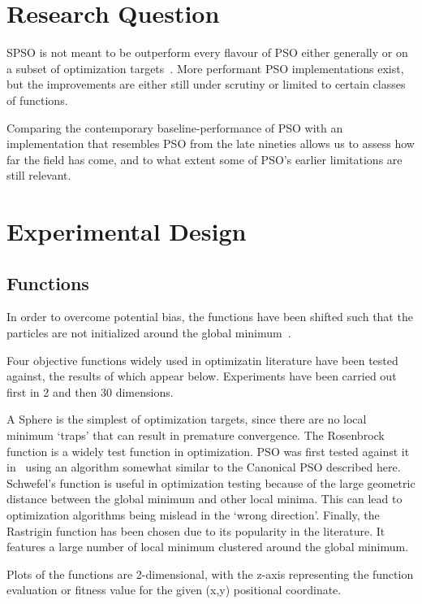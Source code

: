 \documentclass{csfourzero}
\begin{document}
\section{Research Question}

SPSO is not meant to be outperform every flavour of PSO either generally or on a
subset of optimization targets~\cite{Bratton:2007hq}. More performant PSO
implementations exist, but the improvements are either still under scrutiny or
limited to certain classes of functions.

Comparing the contemporary baseline-performance of PSO with an implementation
that resembles PSO from the late nineties allows us to assess how far the field
has come, and to what extent some of PSO's earlier limitations are still
relevant.



\section{Experimental Design}


\subsection{Functions}

In order to overcome potential bias, the functions have been shifted such that
the particles are not initialized around the global
minimum~\cite{Monson:2005fn}.

Four objective functions widely used in optimizatin literature have been tested
against, the results of which appear below. Experiments have been carried out
first in 2 and then 30 dimensions.

A Sphere is the simplest of optimization targets, since there are no local
minimum `traps' that can result in premature convergence. The Rosenbrock
function is a widely test function in optimization. PSO was first tested against
it in~\cite{Shi:1999je} using an algorithm somewhat similar to the Canonical PSO
described here. Schwefel's function is useful in optimization testing because of
the large geometric distance between the global minimum and other local minima.
This can lead to optimization algorithms being mislead in the `wrong direction'.
Finally, the Rastrigin function has been chosen due to its popularity in the
literature. It features a large number of local minimum clustered around the
global minimum.

Plots of the functions are 2-dimensional, with the z-axis representing the
function evaluation or fitness value for the given (x,y) positional coordinate.
\end{document}

